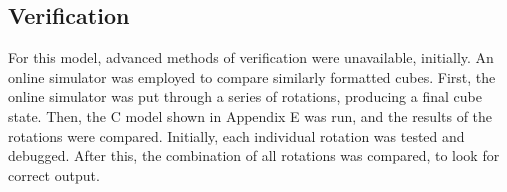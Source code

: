 \documentclass{article}
\begin{document}
\vspace{0.3cm}


\subsection {Verification}

For this model, advanced methods of verification were unavailable, initially. An online simulator was employed to compare similarly formatted cubes. First, the online simulator was put through a series of rotations, producing a final cube state. Then, the C model shown in Appendix E was run, and the results of the rotations were compared. Initially, each individual rotation was tested and debugged. After this, the combination of all rotations was compared, to look for correct output.\\
\end{document}
